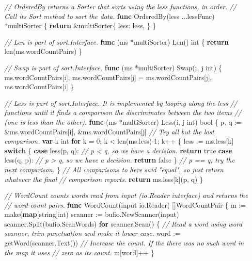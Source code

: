 \documentclass[]{book}
\newenvironment{Shaded}{\begin{snugshade}}{\end{snugshade}}
\newcommand{\BuiltInTok}[1]{#1}
\newcommand{\CommentTok}[1]{\textcolor[rgb]{0.56,0.35,0.01}{\textit{#1}}}
\newcommand{\DataTypeTok}[1]{\textcolor[rgb]{0.13,0.29,0.53}{#1}}
\newcommand{\DecValTok}[1]{\textcolor[rgb]{0.00,0.00,0.81}{#1}}
\newcommand{\KeywordTok}[1]{\textcolor[rgb]{0.13,0.29,0.53}{\textbf{#1}}}
\newcommand{\NormalTok}[1]{#1}
\newcommand{\OtherTok}[1]{\textcolor[rgb]{0.56,0.35,0.01}{#1}}
\begin{document}
\begin{Shaded}
\begin{Highlighting}[]
\CommentTok{// OrderedBy returns a Sorter that sorts using the less functions, in order.}
\CommentTok{// Call its Sort method to sort the data.}
\KeywordTok{func}\NormalTok{ OrderedBy(less ...lessFunc) *multiSorter \{}
    \KeywordTok{return}\NormalTok{ &multiSorter\{}
\NormalTok{        less: less,}
\NormalTok{    \}}
\NormalTok{\}}

\CommentTok{// Len is part of sort.Interface.}
\KeywordTok{func}\NormalTok{ (ms *multiSorter) Len() }\DataTypeTok{int}\NormalTok{ \{}
    \KeywordTok{return} \BuiltInTok{len}\NormalTok{(ms.wordCountPairs)}
\NormalTok{\}}

\CommentTok{// Swap is part of sort.Interface.}
\KeywordTok{func}\NormalTok{ (ms *multiSorter) Swap(i, j }\DataTypeTok{int}\NormalTok{) \{}
\NormalTok{    ms.wordCountPairs[i], ms.wordCountPairs[j] =}
\NormalTok{        ms.wordCountPairs[j], ms.wordCountPairs[i]}
\NormalTok{\}}

\CommentTok{// Less is part of sort.Interface. It is implemented by looping along the less}
\CommentTok{// functions until it finds a comparison the discriminates between the two items}
\CommentTok{// (one is less than the other).}
\KeywordTok{func}\NormalTok{ (ms *multiSorter) Less(i, j }\DataTypeTok{int}\NormalTok{) }\DataTypeTok{bool}\NormalTok{ \{}
\NormalTok{    p, q := &ms.wordCountPairs[i], &ms.wordCountPairs[j]}
    \CommentTok{// Try all but the last comparison.}
    \KeywordTok{var}\NormalTok{ k }\DataTypeTok{int}
    \KeywordTok{for}\NormalTok{ k = }\DecValTok{0}\NormalTok{; k < }\BuiltInTok{len}\NormalTok{(ms.less)-}\DecValTok{1}\NormalTok{; k++ \{}
\NormalTok{        less := ms.less[k]}
        \KeywordTok{switch}\NormalTok{ \{}
        \KeywordTok{case}\NormalTok{ less(p, q):}
            \CommentTok{// p < q, so we have a decision.}
            \KeywordTok{return} \OtherTok{true}
        \KeywordTok{case}\NormalTok{ less(q, p):}
            \CommentTok{// p > q, so we have a decision.}
            \KeywordTok{return} \OtherTok{false}
\NormalTok{        \}}
        \CommentTok{// p == q; try the next comparison.}
\NormalTok{    \}}
    \CommentTok{// All comparisons to here said "equal", so just return whatever the final}
    \CommentTok{// comparison reports.}
    \KeywordTok{return}\NormalTok{ ms.less[k](p, q)}
\NormalTok{\}}

\CommentTok{// WordCount counts words read from input (io.Reader interface) and returns the}
\CommentTok{// word-count pairs.}
\KeywordTok{func}\NormalTok{ WordCount(input io.Reader) []WordCountPair \{}
\NormalTok{    m := }\BuiltInTok{make}\NormalTok{(}\KeywordTok{map}\NormalTok{[}\DataTypeTok{string}\NormalTok{]}\DataTypeTok{int}\NormalTok{)}
\NormalTok{    scanner := bufio.NewScanner(input)}
\NormalTok{    scanner.Split(bufio.ScanWords)}
    \KeywordTok{for}\NormalTok{ scanner.Scan() \{}
        \CommentTok{// Read a word using word scanner, trim punctuation and make it lower case.}
\NormalTok{        word := getWord(scanner.Text())}
        \CommentTok{// Increase the count. If the there was no such word in the map it uses}
        \CommentTok{// zero as its count.}
\NormalTok{        m[word]++}
\NormalTok{    \}}


\end{Highlighting}
\end{Shaded}
\end{document}
